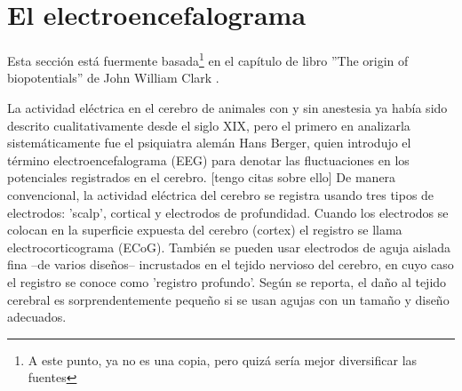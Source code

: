


\section{El electroencefalograma}

Esta secci\'on est\'a fuermente basada\footnote{A este punto, ya
no es una copia, pero quiz\'a ser\'ia mejor diversificar las fuentes} 
en el cap\'itulo de libro 
''The origin of biopotentials'' de John William Clark \cite{clark98}.


La actividad el\'ectrica en el cerebro de animales con y sin anestesia ya hab\'ia sido descrito
cualitativamente desde el siglo XIX, pero el primero en analizarla sistem\'aticamente fue el
psiquiatra alem\'an Hans Berger, quien introdujo el t\'ermino electroencefalograma (EEG) para
denotar las fluctuaciones en los potenciales registrados en el cerebro. [tengo citas sobre ello]
De manera convencional, la actividad el\'ectrica del cerebro se registra usando tres tipos de
electrodos: 'scalp', cortical y electrodos de profundidad.
Cuando los electrodos se colocan en la superficie expuesta del cerebro (cortex) el
registro se llama electrocorticograma (ECoG). Tambi\'en se pueden usar electrodos de aguja
aislada fina --de varios dise\~nos-- incrustados en el tejido nervioso del cerebro, en
cuyo caso el registro se conoce como 'registro profundo'. Seg\'un se reporta, el da\~no al
tejido cerebral es sorprendentemente peque\~no si se usan agujas con un tama\~no
y dise\~no adecuados.

